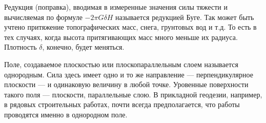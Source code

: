 \documentclass[11pt, a4paper]{article}
\theoremstyle{plain}
\theoremstyle{definition}
\theoremstyle{remark}
\begin{document}
Редукция (поправка), вводимая в измеренные значения силы тяжести и вычисляемая по формуле $-2\pi
G\delta H$ называется редукцией Буге. Так может быть учтено притяжение топографических масс, снега,
грунтовых вод и т.д. То есть в тех случаях, когда высота притягивающих масс много меньше их радиуса.
Плотность $\delta$, конечно, будет меняться.

Поле, создаваемое плоскостью или плоскопараллельным слоем называется однородным. Сила здесь имеет одно и
то же направление --- перпендикулярное плоскости --- и одинаковую величину в любой точке. Уровенные
поверхности такого поля --- плоскости, параллельные слою. В прикладной геодезии, например, в
рядовых строительных работах, почти всегда предполагается, что работы проводятся именно в однородном поле.
\end{document}
